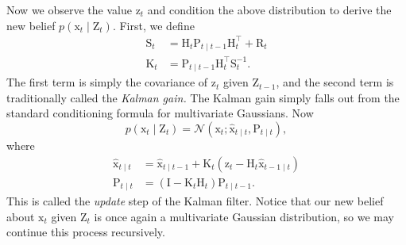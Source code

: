 \documentclass{article}
\newcommand{\given}{\mid}
\newcommand{\mc}[1]{\mathcal{#1}}
\newcommand{\inv}{^{-1}}
\newcommand{\trans}{^\top}
\newcommand{\mat}[1]{\bm{\mathrm{#1}}}
\renewcommand{\vec}[1]{\bm{\mathrm{#1}}}
\begin{document}
Now we observe the value $\vec{z}_t$ and condition the above
distribution to derive the new belief $p(\vec{x}_t \given \mat{Z}_t)$.
First, we define
\begin{align*}
  \mat{S}_t &= \mat{H}_t \mat{P}_{t \given t - 1} \mat{H}_t\trans + \mat{R}_t \\
  \mat{K}_t &= \mat{P}_{t \given t - 1} \mat{H}_t\trans \mat{S}_t\inv.
\end{align*}
The first term is simply the covariance of $\vec{z}_t$ given
$\mat{Z}_{t - 1}$, and the second term is traditionally called the
\emph{Kalman gain.}  The Kalman gain simply falls out from the
standard conditioning formula for multivariate Gaussians.
Now
\[
  p(\vec{x}_t \given \mat{Z}_t)
  =
  \mc{N}(\vec{x}_t;
  \hat{\vec{x}}_{t \given t},
  \mat{P}_{t \given t}
  ),
\]
where
\begin{align*}
  \hat{\vec{x}}_{t \given t}
  &=
  \hat{\vec{x}}_{t \given t - 1}
  + \mat{K}_t (\mat{z}_t - \mat{H}_t \hat{\vec{x}}_{t - 1 \given t})
  \\
  \mat{P}_{t \given t}
  &=
  (\mat{I}
  -
  \mat{K}_t
  \mat{H}_t
  )
  \mat{P}_{t \given t - 1}.
\end{align*}
This is called the \emph{update} step of the Kalman filter.  Notice
that our new belief about $\vec{x}_t$ given $\mat{Z}_t$ is once again
a multivariate Gaussian distribution, so we may continue this process
recursively.
\end{document}
